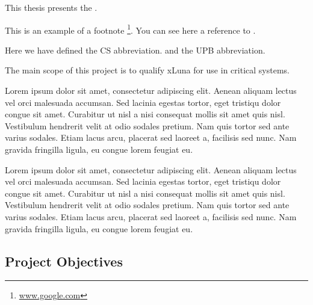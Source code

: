 
This thesis presents the \textbf{\project}.

This is an example of a footnote \footnote{\url{www.google.com}}. You can see here a reference to .

Here we have defined the CS abbreviation. and the UPB abbreviation.

The main scope of this project is to qualify xLuna for use in critical systems.


Lorem ipsum dolor sit amet, consectetur adipiscing elit. Aenean aliquam lectus vel orci malesuada accumsan. Sed lacinia egestas tortor, eget tristiqu dolor congue sit amet. Curabitur ut nisl a nisi consequat mollis sit amet quis nisl. Vestibulum hendrerit velit at odio sodales pretium. Nam quis tortor sed ante varius sodales. Etiam lacus arcu, placerat sed laoreet a, facilisis sed nunc. Nam gravida fringilla ligula, eu congue lorem feugiat eu.

Lorem ipsum dolor sit amet, consectetur adipiscing elit. Aenean aliquam lectus vel orci malesuada accumsan. Sed lacinia egestas tortor, eget tristiqu dolor congue sit amet. Curabitur ut nisl a nisi consequat mollis sit amet quis nisl. Vestibulum hendrerit velit at odio sodales pretium. Nam quis tortor sed ante varius sodales. Etiam lacus arcu, placerat sed laoreet a, facilisis sed nunc. Nam gravida fringilla ligula, eu congue lorem feugiat eu.


\subsection{Project Objectives}
\label{sub-sec:proj-objectives}


